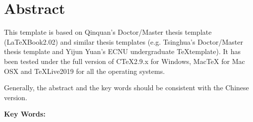 \thispagestyle{fancy}
\renewcommand{\baselinestretch}{1.8}

\chapter*{Abstract}
    
    This template is based on Qinquan's Doctor/Master thesis template (LaTeXBook2.02)
    and similar thesis templates (e.g. Tsinghua's Doctor/Master thesis template and Yijun Yuan's ECNU undergraduate \TeX template).
    It has been tested under the full version of CTeX2.9.x for Windows, MacTeX for Mac OSX and TeXLive2019 for all the operating systems.
    
    Generally, the abstract and the key words should be consistent
    with the Chinese version.

\vspace{1em}
\noindent 
\textbf{Key Words:} \KeywordsENG
